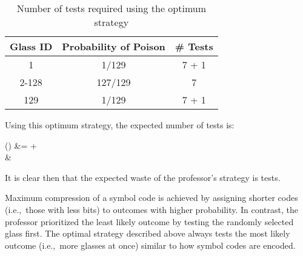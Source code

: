 \begin{table}[h]
  \centering
  \begin{tabular}{c|c|c}
    \hline
    Glass ID & Probability of Poison & \# Tests  \\\hline
    1        & 1/129                 & 7 + 1     \\\hline
    2-128    & 127/129               & 7         \\\hline
    129      & 1/129                 & 7 + 1     \\\hline
  \end{tabular}
  \caption{Number of tests required using the optimum strategy}\label{tab:problem5.9.20-Opt}
\end{table}

\noindent
Using this optimum strategy, the expected number of tests is:

\begin{aligncustom}
  () &=   +   \\
  &\approx {}
\end{aligncustom}

It is clear then that the expected waste of the professor's strategy is  tests.

Maximum compression of a symbol code is achieved by assigning shorter codes (i.e.,~those with less bits) to outcomes with higher probability.  In contrast, the professor prioritized the least likely outcome by testing the randomly selected glass first.  The optimal strategy described above always tests the most likely outcome (i.e.,~more glasses at once) similar to how symbol codes are encoded.